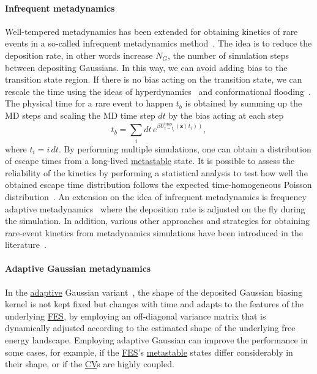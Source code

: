 \documentclass[9pt,review]{livecoms}
\newcommand{\vz}{\mathbf{z}}
\begin{document}
\paragraph{Infrequent metadynamics}
\label{sec:infreq_meta}
Well-tempered metadynamics has been extended for obtaining kinetics of rare events in a so-called infrequent metadynamics method~\cite{Tiwary-PRL-2013}. The idea is to reduce the deposition rate, in other words increase $N_{G}$, the number of simulation steps between depositing Gaussians. In this way, we can avoid adding bias to the transition state region. If there is no bias acting on the transition state, we can rescale the time using the ideas of hyperdynamics~\cite{Voter-PRL-1997} and conformational flooding~\cite{Grubmuller-PRE-1995}. The physical time for a rare event to happen $t_b$ is obtained by summing up the MD steps and scaling the MD time step $dt$ by the bias acting at each step
\begin{equation}
\label{wtmetad_hyperdynamics}
t_b = \sum_{i} dt \, e^{\beta U_{t=t_{i}}^{\mathrm{bias}}(\vz(t_{i}))},
\end{equation}
where $t_{i} = i\, dt$. By performing multiple simulations, one can obtain a distribution of escape times from a long-lived \hyperlink{ref:metastab} {metastable} state. It is possible to assess the reliability of the kinetics by performing a statistical analysis to test how well the obtained escape time distribution follows the expected time-homogeneous Poisson distribution~\cite{KS_Test_JCTC_2014}. An extension on the idea of infrequent metadynamics is frequency adaptive metadynamics~\cite{Wang2018_FA-MetaD} where the deposition rate is adjusted on the fly during the simulation. In addition, various other approaches and strategies for obtaining rare-event kinetics from metadynamics simulations have been introduced in the literature~\cite{
10.1021/acs.biochem.8b00977,
10.1021/ar500356n,
10.1371/journal.pcbi.1000452,
10.1021/ja903045y,
10.1103/physrevlett.110.108106,
10.1063/1.5027728,
10.1103/physreve.98.052408,
10.1063/5.0019100,
10.1021/acs.jpclett.2c01807}.

\paragraph{Adaptive Gaussian metadynamics}
\label{sec:AGmeta}
In the \hyperlink{ref:Adaptive} {adaptive} Gaussian variant~\cite{Branduardi-JCTC-2012}, the shape of the deposited Gaussian biasing kernel is not kept fixed but changes with time and adapts to the features of the underlying \hyperlink{ref:FES} {FES}, by employing an off-diagonal variance matrix that is dynamically adjusted according to the estimated shape of the underlying free energy landscape. Employing adaptive Gaussian can improve the performance in some cases, for example, if the \hyperlink{ref:FES} {FES}'s \hyperlink{ref:metastab} {metastable} states differ considerably in their shape, or if the \hyperlink{ref:CV} {CV}s are highly coupled.
\end{document}
